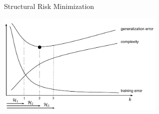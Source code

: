\documentclass[11pt,compress,t,notes=noshow, xcolor=table]{beamer}
\begin{document}
\begin{vbframe} {Structural Risk Minimization}
\begin{center}
\includegraphics[width=0.6\textwidth]{figure_man/fig-regu-srm-2}
\end{center}

\end{vbframe}
\end{document}
